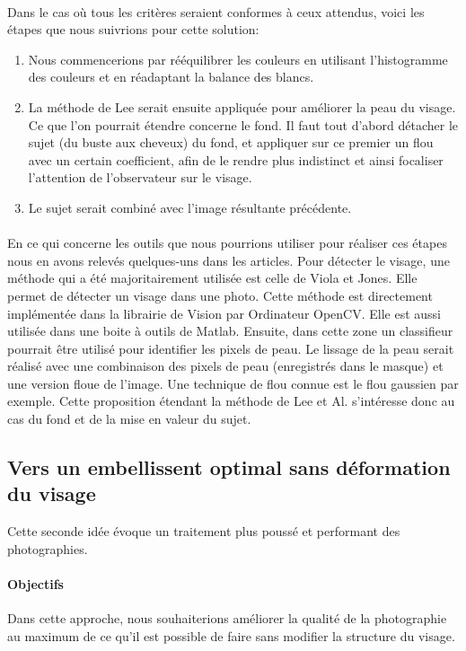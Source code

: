 \documentclass[11pt, french,screen]{report-rd-info}
\begin{document}
\paragraph{}
Dans le cas où tous les critères seraient conformes à ceux attendus, voici les étapes que nous suivrions pour cette solution:
\begin{enumerate}
\item Nous commencerions par rééquilibrer les couleurs en utilisant l’histogramme des couleurs et en réadaptant la balance des blancs.
\item La méthode de Lee serait ensuite appliquée pour améliorer la peau du visage. Ce que l’on pourrait étendre concerne le fond. Il faut tout d’abord détacher le sujet (du buste aux cheveux) du fond, et appliquer sur ce premier un flou avec un certain coefficient, afin de le rendre plus indistinct et ainsi focaliser l’attention de l’observateur sur le visage.
\item Le sujet serait combiné avec l’image résultante précédente.
\end{enumerate}
\paragraph{}
En ce qui concerne les outils que nous pourrions utiliser pour réaliser ces étapes nous en avons relevés quelques-uns dans les articles. Pour détecter le visage, une méthode qui a été majoritairement utilisée est celle de Viola et Jones. Elle permet de détecter un visage dans une photo. Cette méthode est directement implémentée dans la librairie de Vision par Ordinateur OpenCV. Elle est aussi utilisée dans une boite à outils de Matlab. Ensuite, dans cette zone un classifieur pourrait être utilisé pour identifier les pixels de peau.
Le lissage de la peau serait réalisé avec une combinaison des pixels de peau (enregistrés dans le masque) et une version floue de l’image. Une technique de flou connue est le flou gaussien par exemple.
Cette proposition étendant la méthode de Lee et Al. s’intéresse donc au cas du fond et de la mise en valeur du sujet.
\subsection{Vers un embellissent optimal sans déformation du visage}
\label{propdeux}
Cette seconde idée évoque un traitement plus poussé et performant des photographies.
\paragraph{Objectifs}
Dans cette approche, nous souhaiterions améliorer la qualité de la photographie au maximum de ce qu’il est possible de faire sans modifier la structure du visage.
\end{document}
